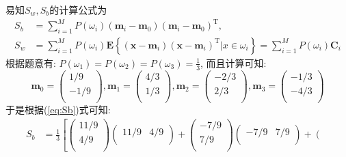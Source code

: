 \documentclass{article}
\begin{document}
\begin{homeworkProblem}
	\solution 易知$S_w,S_b$的计算公式为
	\begin{align}
		S_b&=\sum_{i=1}^M{P\left( \omega _i \right) \left( \boldsymbol{m}_i-\boldsymbol{m}_0 \right) \left( \boldsymbol{m}_i-\boldsymbol{m}_0 \right) ^{\mathrm{T}}}, \label{eq:Sb}
		\\
		S_w&=\sum_{i=1}^M{P\left( \omega _i \right) \mathbf{E}\left\{ \left( \boldsymbol{x}-\boldsymbol{m}_i \right) \left( \boldsymbol{x}-\boldsymbol{m}_i \right) ^{\mathrm{T}}|x\in \omega _i \right\}}=\sum_{i=1}^M{P\left( \omega _i \right) \boldsymbol{C}_i}  \label{eq:Sw}
	\end{align}
	根据题意有: $P\left( \omega _1 \right) =P\left( \omega _2 \right) =P\left( \omega _3 \right) =\frac{1}{3}$, 而且计算可知:
	$$\boldsymbol{m}_0=\left( \begin{array}{c}
		1/9\\
		-1/9\\
	\end{array} \right) , \boldsymbol{m}_1=\left( \begin{array}{c}
		4/3\\
		1/3\\
	\end{array} \right) ,  \boldsymbol{m}_2=\left( \begin{array}{c}
		-2/3\\
		2/3\\
	\end{array} \right) ,  \boldsymbol{m}_3=\left( \begin{array}{c}
		-1/3\\
		-4/3\\
	\end{array} \right)
	$$
	于是根据(\ref{eq:Sb})式可知:
	\begin{align}
	S_b&=\frac{1}{3}\left[ \left( \begin{array}{c}
		11/9\\
		4/9\\
	\end{array} \right) \left( \begin{matrix}
		11/9&		4/9\\
	\end{matrix} \right) +\left( \begin{array}{c}
		-7/9\\
		7/9\\
	\end{array} \right) \left( \begin{matrix}
		-7/9&		7/9\\
	\end{matrix} \right) +\left( \begin{array}{c}

\end{array}
\end{align}
\end{homeworkProblem}
\end{document}
